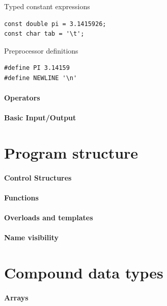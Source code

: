 \documentclass{beamer}
\begin{document}
\begin{frame}[fragile]{Typed constant expressions}
\begin{lstlisting}[caption=Typed constant expressions]
const double pi = 3.1415926;
const char tab = '\t';
\end{lstlisting}
\end{frame}

\begin{frame}[fragile]{Preprocessor definitions}
\begin{lstlisting}[caption=Preprocessor definitions]
#define PI 3.14159
#define NEWLINE '\n'
\end{lstlisting}

\end{frame}


\subsection{Operators}
\subsection{Basic Input/Output}

\part{Program structure}
\subsection{Control Structures}
\subsection{Functions}
\subsection{Overloads and templates}
\subsection{Name visibility}

\part{Compound data types}
\subsection{Arrays}
\end{document}
